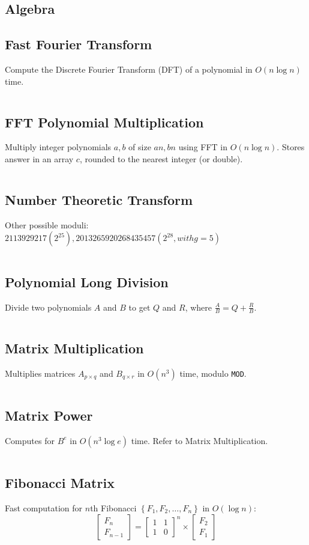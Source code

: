 \documentclass[8pt,a4paper,landscape,oneside]{amsart}
\newcommand{\code}[1]{\inputminted[fontsize=\normalsize,baselinestretch=1]{cpp}{_code/#1}}
\begin{document}
\begin{multicols*}{3}
\section{Algebra}
  \subsection{Fast Fourier Transform}
    Compute the Discrete Fourier Transform (DFT) of a polynomial in $O(n \log n)$ time.
    \code{algebra/fft.cpp}
  \subsection{FFT Polynomial Multiplication}
    Multiply integer polynomials $a, b$ of size $an, bn$ using FFT in $O(n \log n)$. Stores answer in an array $c$, rounded to the nearest integer (or double).
    \code{algebra/fft-poly-mul.cpp}
  \subsection{Number Theoretic Transform}
    Other possible moduli: $2 113 929 217 (2^{25}), 2 013 265 920 268 435 457 (2^{28}, with g = 5)$
    \code{algebra/ntt.cpp}
  \subsection{Polynomial Long Division}
    Divide two polynomials $A$ and $B$ to get $Q$ and $R$, where $\frac{A}{B} = Q + \frac{R}{B}$.
    \code{algebra/poly-long-div.cpp}
  \subsection{Matrix Multiplication}
    Multiplies matrices $A_{p\times q}$ and $B_{q\times r}$ in $O(n^3)$ time, modulo \texttt{MOD}.
    \code{algebra/matmul.java}
  \subsection{Matrix Power}
    Computes for $B^e$ in $O(n^3 \log e)$ time. Refer to Matrix Multiplication.
    \code{algebra/matpow.java}
  \subsection{Fibonacci Matrix}
    Fast computation for $n$th Fibonacci $\left\{F_1,F_2,\ldots,F_n \right\}$ in $O(\log n)$:
    \[
    \begin{bmatrix}
        F_n \\
        F_{n-1}
    \end{bmatrix}
    =
    \begin{bmatrix}
        1 & 1 \\
        1 & 0
    \end{bmatrix}^n
    \times
    \begin{bmatrix}
        F_2 \\
        F_1
    \end{bmatrix}
    \]

\end{multicols*}
\end{document}

